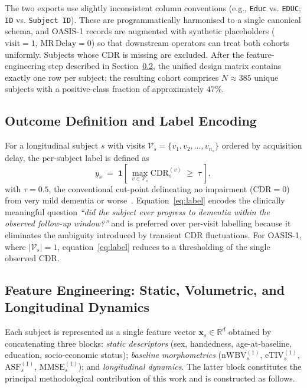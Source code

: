 The two exports use slightly inconsistent column conventions (e.g., \texttt{Educ} vs. \texttt{EDUC}; \texttt{ID} vs. \texttt{Subject ID}). These are programmatically harmonised to a single canonical schema, and OASIS-1 records are augmented with synthetic placeholders ($\mathrm{visit}=1$, $\mathrm{MR\,Delay}=0$) so that downstream operators can treat both cohorts uniformly. Subjects whose CDR is missing are excluded. After the feature-engineering step described in Section~\ref{subsec:feature_eng}, the unified design matrix contains exactly one row per subject; the resulting cohort comprises $N \approx 385$ unique subjects with a positive-class fraction of approximately $47\%$.

\subsection{Outcome Definition and Label Encoding}
\label{subsec:outcome}

For a longitudinal subject $s$ with visits $\mathcal{V}_s = \{v_1, v_2, \ldots, v_{n_s}\}$ ordered by acquisition delay, the per-subject label is defined as
\begin{equation}
y_s \;=\; \mathbf{1}\!\left[\, \max_{v \in \mathcal{V}_s} \mathrm{CDR}_s^{(v)} \;\geq\; \tau \,\right],
\label{eq:label}
\end{equation}
with $\tau = 0.5$, the conventional cut-point delineating no impairment ($\mathrm{CDR}=0$) from very mild dementia or worse~\cite{morris1993cdr}. Equation~\eqref{eq:label} encodes the clinically meaningful question \emph{``did the subject ever progress to dementia within the observed follow-up window?''} and is preferred over per-visit labelling because it eliminates the ambiguity introduced by transient CDR fluctuations. For OASIS-1, where $|\mathcal{V}_s|=1$, equation~\eqref{eq:label} reduces to a thresholding of the single observed CDR.

\subsection{Feature Engineering: Static, Volumetric, and Longitudinal Dynamics}
\label{subsec:feature_eng}

Each subject is represented as a single feature vector $\mathbf{x}_s \in \mathbb{R}^{d}$ obtained by concatenating three blocks: \emph{static descriptors} (sex, handedness, age-at-baseline, education, socio-economic status); \emph{baseline morphometrics} ($\mathrm{nWBV}^{(1)}_s$, $\mathrm{eTIV}^{(1)}_s$, $\mathrm{ASF}^{(1)}_s$, $\mathrm{MMSE}^{(1)}_s$); and \emph{longitudinal dynamics}. The latter block constitutes the principal methodological contribution of this work and is constructed as follows.

